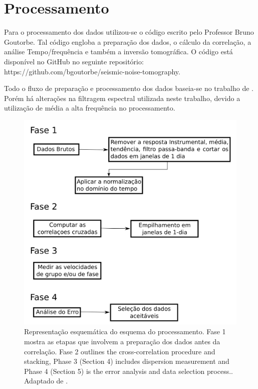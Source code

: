 \section{Processamento}

Para o processamento dos dados utilizou-se o código escrito pelo Professor Bruno Goutorbe. Tal código engloba a preparação dos dados, o cálculo da correlação, a análise Tempo/frequência e também a inversão tomográfica.  O código está disponível no GitHub no seguinte repositório: https://github.com/bgoutorbe/seismic-noise-tomography.

Todo o fluxo de preparação e processamento dos dados  baseia-se no trabalho de \cite{bensen_processing_2007}. Porém há alterações na filtragem espectral utilizada neste trabalho, devido a utilização de média a alta frequência no processamento.


\begin{figure}[!ht]
\centering
\includegraphics[scale=0.8]{fluxograma_bensen2007.png}
\caption{Representação esquemática do esquema do processamento. Fase 1 mostra as etapas que involvem a preparação dos dados antes da correlação. Fase 2 outlines the cross-correlation procedure and stacking, Phase 3 (Section 4) includes dispersion measurement and Phase 4 (Section 5) is the error analysis and data selection process.. Adaptado de \cite{bensen_processing_2007}.}
\label{fluxograma_bensen2007}
\end{figure} 

